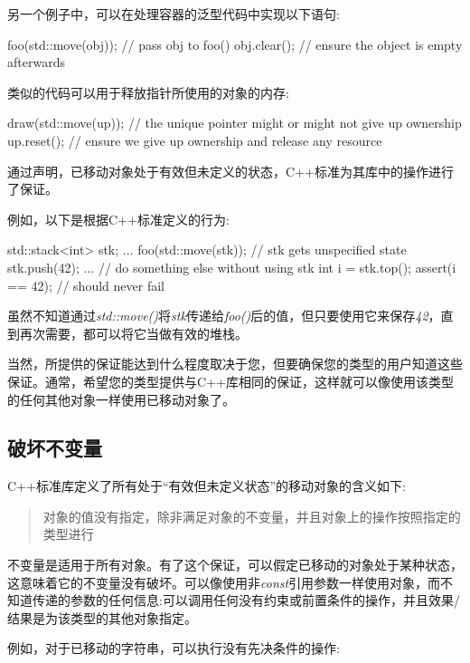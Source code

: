 另一个例子中，可以在处理容器的泛型代码中实现以下语句:

\begin{cppcode}
foo(std::move(obj)); // pass obj to foo()
obj.clear(); // ensure the object is empty afterwards
\end{cppcode}

类似的代码可以用于释放指针所使用的对象的内存:

\begin{cppcode}
draw(std::move(up)); // the unique pointer might or might not give up ownership
up.reset(); // ensure we give up ownership and release any resource
\end{cppcode}

通过声明，已移动对象处于有效但未定义的状态，C++标准为其库中的操作进行了保证。

例如，以下是根据C++标准定义的行为:

\begin{cppcode}
std::stack<int> stk;
...
foo(std::move(stk)); // stk gets unspecified state
stk.push(42);
... // do something else without using stk
int i = stk.top();
assert(i == 42); // should never fail
\end{cppcode}

虽然不知道通过\textit{std::move()}将\textit{stk}传递给\textit{foo()}后的值，但只要使用它来保存\textit{42}，直到再次需要，都可以将它当做有效的堆栈。

当然，所提供的保证能达到什么程度取决于您，但要确保您的类型的用户知道这些保证。通常，希望您的类型提供与C++库相同的保证，这样就可以像使用该类型的任何其他对象一样使用已移动对象了。

\subsection{破坏不变量}

C++标准库定义了所有处于“有效但未定义状态”的移动对象的含义如下:

\begin{quote}
	对象的值没有指定，除非满足对象的不变量，并且对象上的操作按照指定的类型进行
\end{quote}

不变量是适用于所有对象。有了这个保证，可以假定已移动的对象处于某种状态，这意味着它的不变量没有破坏。可以像使用非\textit{const}引用参数一样使用对象，而不知道传递的参数的任何信息:可以调用任何没有约束或前置条件的操作，并且效果/结果是为该类型的其他对象指定。

例如，对于已移动的字符串，可以执行没有先决条件的操作:

